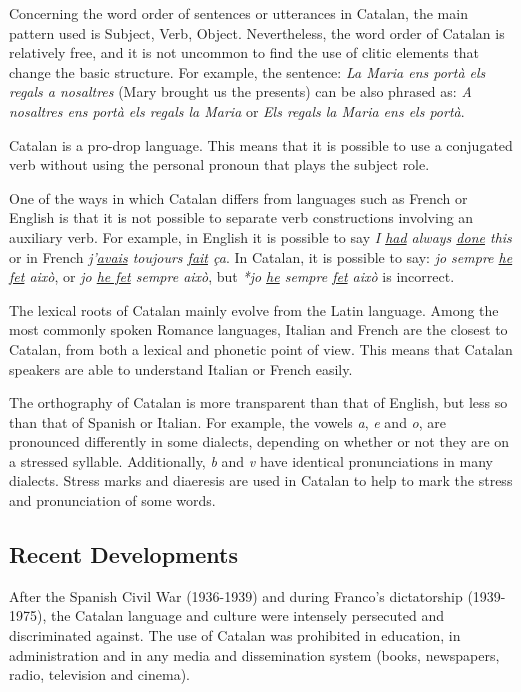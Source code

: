 \begin{multicols}{2}

Concerning the word order of sentences or utterances in Catalan, the main pattern used is Subject, Verb, Object. Nevertheless, the word order of Catalan is relatively free, and it is not uncommon to find the use of clitic elements that change the basic structure. For example, the sentence: \textit{La Maria ens portà els regals a nosaltres} (Mary brought us the presents) can be also phrased as: \textit{A nosaltres ens portà els regals la Maria} or \textit{Els regals la Maria ens els portà}.

Catalan is a pro-drop language. This means that it is possible to use a conjugated verb without using the personal pronoun that plays the subject role.

One of the ways in which Catalan differs from languages such as  French or English is that it is not possible to separate verb constructions involving an auxiliary verb. For example, in English it is possible to say \textit{I \underline{had} always \underline{done} this} or in French \textit{j'\underline{avais} toujours \underline{fait} ça}. In Catalan, it is possible to say: \textit{jo sempre \underline{he fet} això}, or \textit{jo \underline{he fet} sempre això}, but \textit{*jo \underline{he} sempre \underline{fet} això} is incorrect.

The lexical roots of Catalan mainly evolve from the Latin language. Among the most commonly spoken Romance languages, Italian and French are the closest to Catalan, from both a lexical and phonetic point of view. This means that Catalan speakers are able to understand Italian or French easily.

The orthography of Catalan is more transparent than that of English, but less so than that of Spanish or Italian. For example, the vowels \textit{a}, \textit{e} and \textit{o}, are pronounced differently in some dialects, depending on whether or not they are on a stressed syllable. Additionally, \textit{b} and \textit{v} have identical pronunciations in many dialects. Stress marks and diaeresis are used in Catalan to help to mark the stress and pronunciation of some words.

\subsection{Recent Developments}

After the Spanish Civil War (1936-1939) and during Franco’s dictatorship (1939-1975), the Catalan language and culture were intensely persecuted and discriminated against. The use of Catalan was prohibited in education, in administration and in any media and dissemination system (books, newspapers, radio, television and cinema).


\end{multicols}
